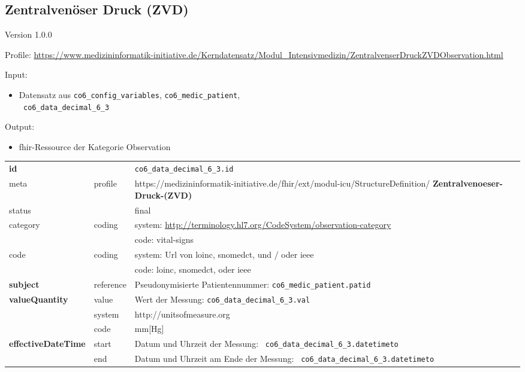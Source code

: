 \subsection{Zentralvenöser Druck (ZVD)} 
\noindent Version 1.0.0

\noindent Profile: \url{https://www.medizininformatik-initiative.de/Kerndatensatz/Modul_Intensivmedizin/ZentralvenserDruckZVDObservation.html}

\noindent Input:
\begin{itemize}
	\item Datensatz aus \texttt{co6\_config\_variables}, \texttt{co6\_medic\_patient}, \\ \texttt{
co6\_data\_decimal\_6\_3}
\end{itemize}
Output:
\begin{itemize}
        \item \ac{fhir}-Ressource der Kategorie \glqq Observation\grqq{}
\end{itemize}
\begin{longtable}{|l|l|p{7.5cm}|}
        \hline
        \rowcolor{lightgray} \multicolumn{3}{|l|}{Data Mapping (inhaltlich)} \\ \hline
        \textbf{id} &  & \texttt{co6\_data\_decimal\_6\_3.id} \\ \hline
	meta & profile & https://medizininformatik-initiative.de/fhir/ext/modul-icu/StructureDefinition/\textbf{
Zentralvenoeser-Druck-(ZVD)} \\ \hline 
	status &  & final   \\ \hline 
	category & coding & system: \url{http://terminology.hl7.org/CodeSystem/observation-category} \\
\cline{3-3}
	& & code: vital-signs \\ \hline
	code & coding & system: Url von \ac{loinc}, \ac{snomedct}, und / oder \ac{ieee} \\ 
	\cline{3-3} 
	 &  & code: \ac{loinc}, \ac{snomedct}, oder \ac{ieee} \\ \hline
	 \textbf{subject}  & reference & Pseudonymisierte Patientennummer: \texttt{co6\_medic\_patient.patid} \\ \hline
	 \textbf{valueQuantity}  & value & Wert der Messung: \texttt{co6\_data\_decimal\_6\_3.val} \\
        \cline{2-3}
         & system & http://unitsofmeasure.org \\
         \cline{2-3}
         & code & mm[Hg] \\ \hline
     \textbf{effectiveDateTime}  & start & Datum und Uhrzeit der Messung: \texttt{
co6\_data\_decimal\_6\_3.datetimeto} \\
    \cline{2-3}
     & end & Datum und Uhrzeit am Ende der Messung: \texttt{
co6\_data\_decimal\_6\_3.datetimeto} \\ \hline
\end{longtable}
